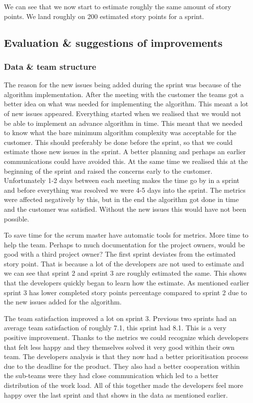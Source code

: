 \documentclass{article}
\begin{document}
We can see that we now start to estimate roughly the same amount of story points. We land roughly on 200 estimated story points for a sprint. 


\subsection{Evaluation \& suggestions of improvements}

\subsubsection{Data \& team structure}
The reason for the new issues being added during the sprint was because of the algorithm implementation. After the meeting with the customer the teams got a better idea on what was needed for implementing the algorithm. This meant a lot of new issues appeared. Everything started when we realised that we would not be able to implement an advance algorithm in time. This meant that we needed to know what the bare minimum algorithm complexity was acceptable for the customer. This should preferably be done before the sprint, so that we could estimate those new issues in the sprint. A better planning and perhaps an earlier communications could have avoided this. At the same time we realised this at the beginning of the sprint and raised the concerns early to the customer. Unfortunately 1-2 days between each meeting makes the time go by in a sprint and before everything was resolved we were 4-5 days into the sprint. The metrics were affected negatively by this, but in the end the algorithm got done in time and the customer was satisfied. Without the new issues this would have not been possible.

To save time for the scrum master have automatic tools for metrics. More time to help the team. Perhaps to much documentation for the project owners, would be good with a third project owner? 
The first sprint deviates from the  estimated story point. That is because a lot of the developers are not used to estimate and we can see that sprint 2 and sprint 3 are roughly estimated the same. This shows that the developers quickly began to learn how the estimate. As mentioned earlier sprint 3 has lower completed story points percentage compared to sprint 2 due to the new issues added for the algorithm.  

The team satisfaction improved a lot on sprint 3. Previous two sprints had an average team satisfaction of roughly 7.1, this sprint had 8.1. This is a very positive improvement. Thanks to the metrics we could recognize which developers that felt less happy and they themselves solved it very good within their own team. The developers analysis is that they now had a better prioritisation process due to the deadline for the product. They also had a better cooperation within the sub-teams were they had close communication which led to a better distribution of the work load. All of this together made the developers feel more happy over the last sprint and that shows in the data as mentioned earlier.
\end{document}
